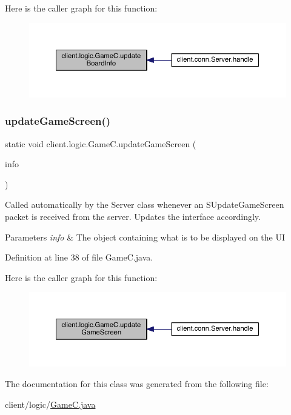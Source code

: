 Here is the caller graph for this function\+:
\nopagebreak
\begin{figure}[H]
\begin{center}
\leavevmode
\includegraphics[width=350pt]{classclient_1_1logic_1_1_game_c_a055e1c7cadc523d1c851af8856b0214d_icgraph}
\end{center}
\end{figure}
\hypertarget{classclient_1_1logic_1_1_game_c_a5efa8858529daa61b2c4639b9a7c2949}{}\label{classclient_1_1logic_1_1_game_c_a5efa8858529daa61b2c4639b9a7c2949} 
\subsubsection{\texorpdfstring{update\+Game\+Screen()}{updateGameScreen()}}
{\footnotesize\ttfamily static void client.\+logic.\+Game\+C.\+update\+Game\+Screen (\begin{DoxyParamCaption}\item[{\hyperlink{classpt_1_1up_1_1fe_1_1lpro1613_1_1sharedlib_1_1structs_1_1_game_u_i_info}{Game\+U\+I\+Info}}]{info }\end{DoxyParamCaption})\hspace{0.3cm}{\ttfamily [static]}}

Called automatically by the {\ttfamily Server} class whenever an {\ttfamily S\+Update\+Game\+Screen} packet is received from the server. Updates the interface accordingly.


\begin{DoxyParams}{Parameters}
{\em info} & The object containing what is to be displayed on the UI \\
\hline
\end{DoxyParams}


Definition at line 38 of file Game\+C.\+java.

Here is the caller graph for this function\+:
\nopagebreak
\begin{figure}[H]
\begin{center}
\leavevmode
\includegraphics[width=350pt]{classclient_1_1logic_1_1_game_c_a5efa8858529daa61b2c4639b9a7c2949_icgraph}
\end{center}
\end{figure}


The documentation for this class was generated from the following file\+:\begin{DoxyCompactItemize}
\item 
client/logic/\hyperlink{_game_c_8java}{Game\+C.\+java}\end{DoxyCompactItemize}
